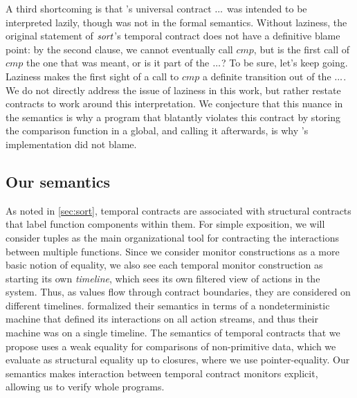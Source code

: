 A third shortcoming is that \dfm's universal contract ${\tt ...}$ was intended to be interpreted lazily, though was not in the formal semantics.
%
Without laziness, the original statement of $\mathit{sort}$'s temporal contract does not have a definitive blame point: by the second clause, we cannot eventually call $\mathit{cmp}$, but is the first call of $\mathit{cmp}$ the one that was meant, or is it part of the ${\tt ...}$? To be sure, let's keep going.
%
Laziness makes the first sight of a call to $\mathit{cmp}$ a definite transition out of the ${\tt ...}$.
%
We do not directly address the issue of laziness in this work, but rather restate contracts to work around this interpretation.
%
We conjecture that this nuance in the semantics is why a program that blatantly violates this contract by storing the comparison function in a global, and calling it afterwards, is why \dfm's implementation did not blame.
%

\subsection{Our semantics}
%
As noted in \autoref{sec:sort}, temporal contracts are associated with structural contracts that label function components within them.
%
For simple exposition, we will consider tuples as the main organizational tool for contracting the interactions between multiple functions.
%
Since we consider monitor constructions as a more basic notion of equality, we also see each temporal monitor construction as starting its own \emph{timeline}, which sees its own filtered view of actions in the system.
%
Thus, as values flow through contract boundaries, they are considered on different timelines.
%
\dfm{} formalized their semantics in terms of a nondeterministic machine that defined its interactions on all action streams, and thus their machine was on a single timeline.
%
The semantics of temporal contracts that we propose uses a weak equality for comparisons of non-primitive data, which we evaluate as structural equality up to closures, where we use pointer-equality.
%
Our semantics makes interaction between temporal contract monitors explicit, allowing us to verify whole programs.

